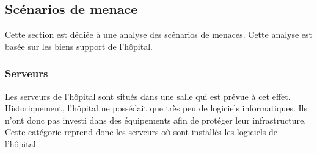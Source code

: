 \documentclass[12pt]{article}
\begin{document}
\subsection{Scénarios de menace}

Cette section est dédiée à une analyse des scénarios de menaces. Cette analyse est basée sur les biens support de l'hôpital.

\subsubsection{Serveurs}

Les serveurs de l'hôpital sont situés dans une salle qui est prévue à cet effet. Historiquement, l'hôpital ne possédait que très peu de logiciels informatiques. Ils n'ont donc pas investi dans des équipements afin de protéger leur infrastructure. Cette catégorie reprend donc les serveurs où sont installés les logiciels de l'hôpital.
\end{document}
